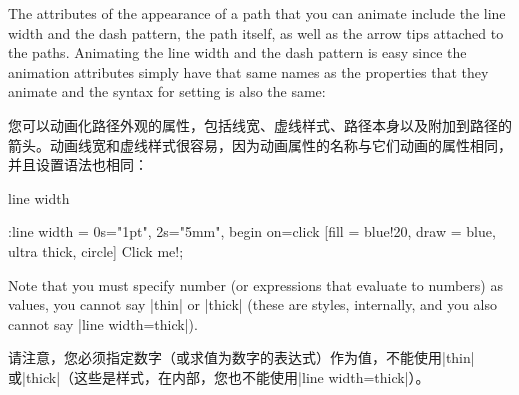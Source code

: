 The attributes of the appearance of a path that you can animate include the
line width and the dash pattern, the path itself, as well as the arrow tips
attached to the paths. Animating the line width and the dash pattern is easy
since the animation attributes simply have that same names as the properties
that they animate and the syntax for setting is also the same:

您可以动画化路径外观的属性，包括线宽、虚线样式、路径本身以及附加到路径的箭头。动画线宽和虚线样式很容易，因为动画属性的名称与它们动画的属性相同，并且设置语法也相同：

\begin{tikzanimateattribute}{line width}
\begin{codeexample}[
    preamble={\usetikzlibrary{animations}},
    animation list={0.5,1,1.5,2},
]
\tikz \node :line width = { 0s="1pt", 2s="5mm", begin on=click}
  [fill = blue!20, draw = blue, ultra thick, circle] {Click me!};
\end{codeexample}
    Note that you must specify number (or expressions that evaluate to numbers)
    as values, you cannot say |thin| or |thick| (these are styles, internally,
    and you also cannot say |line width=thick|).

    请注意，您必须指定数字（或求值为数字的表达式）作为值，不能使用|thin|或|thick|（这些是样式，在内部，您也不能使用|line width=thick|）。


\end{tikzanimateattribute}

